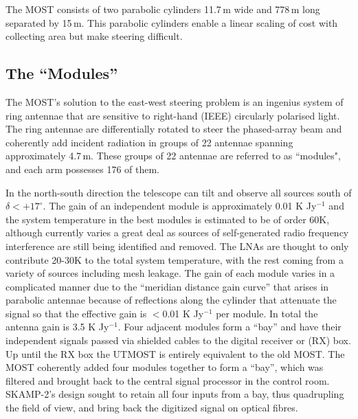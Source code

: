 
The MOST consists of two parabolic cylinders 11.7\,m wide and 778\,m long separated by 15\,m. This parabolic cylinders enable a linear scaling of cost with collecting area but make steering difficult.

\subsection{The ``Modules''}
The MOST's solution to the east-west steering problem is an ingenius system of ring antennae that are sensitive to right-hand (IEEE) circularly polarised light. The ring antennae are differentially rotated to steer the phased-array beam and coherently add incident radiation in groups of 22 antennae spanning approximately 4.7\,m. These groups of 22 antennae are referred to as ``modules", and each arm possesses 176 of them. 

In the north-south direction the telescope can tilt and observe all sources south of $\delta<+17^\circ$. The gain of an independent module is approximately 0.01 K Jy$^{-1}$ and the system temperature in the best modules is estimated to be of order 60K, although currently varies a great deal as sources of self-generated radio frequency interference are still being identified and removed. The LNAs are thought to only contribute 20-30K to the total system temperature, with the rest coming from a variety of sources including mesh leakage. The gain of each module varies in a complicated manner due to the ``meridian distance gain curve'' that arises in parabolic antennae because of reflections along the cylinder that attenuate the signal so that the effective gain is $<$0.01 K Jy$^{-1}$ per module\cite{Hunstead_1996}. In total the antenna gain is 3.5 K Jy$^{-1}$.
Four adjacent modules form a ``bay'' and have their independent signals passed via shielded cables to the digital receiver or (RX) box. Up until the RX box the UTMOST is entirely equivalent to the old MOST. The MOST coherently added four modules together to form a ``bay'', which was filtered and brought back to the central signal processor in the control room. SKAMP-2's design sought to retain all four inputs from a bay, thus quadrupling the field of view, and bring back the digitized signal on optical fibres.